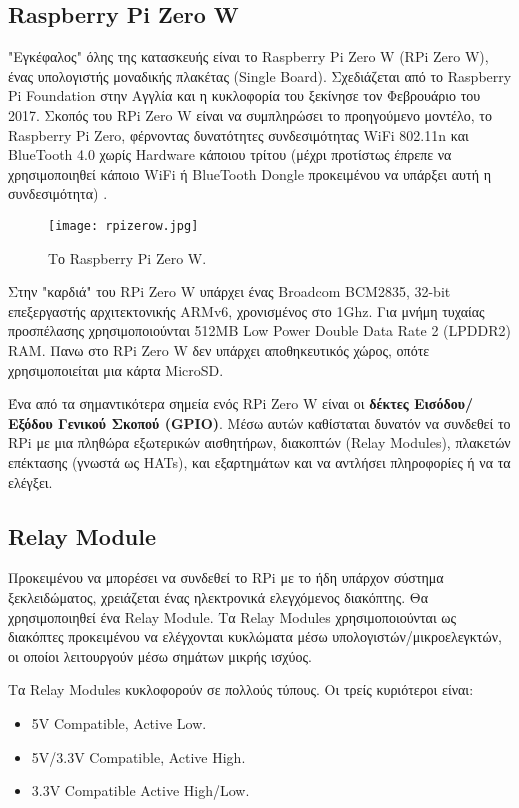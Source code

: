 	\subsection{Raspberry Pi Zero W}
		"Εγκέφαλος" όλης της κατασκευής είναι το Raspberry Pi Zero W (RPi Zero W), ένας υπολογιστής μοναδικής πλακέτας (Single Board). Σχεδιάζεται από το Raspberry Pi Foundation στην Αγγλία και η κυκλοφορία του ξεκίνησε τον Φεβρουάριο του 2017. Σκοπός του RPi Zero W είναι να συμπληρώσει το προηγούμενο μοντέλο, το Raspberry Pi Zero, φέρνοντας δυνατότητες συνδεσιμότητας WiFi 802.11n και BlueTooth 4.0 χωρίς Hardware κάποιου τρίτου (μέχρι προτίστως έπρεπε να χρησιμοποιηθεί κάποιο WiFi ή BlueTooth Dongle προκειμένου να υπάρξει αυτή η συνδεσιμότητα) \textsuperscript{\cite{rpizw}}.

		\begin{figure}[h]
			\centering
				\texttt{[image: rpizerow.jpg]}
			\caption{Το Raspberry Pi Zero W.}
		\end{figure}

		Στην "καρδιά" του RPi Zero W υπάρχει ένας Broadcom BCM2835, 32-bit επεξεργαστής αρχιτεκτονικής ARMv6, χρονισμένος στο 1Ghz. Για μνήμη τυχαίας προσπέλασης χρησιμοποιούνται 512MB Low Power Double Data Rate 2 (LPDDR2) RAM. Πανω στο RPi Zero W δεν υπάρχει αποθηκευτικός χώρος, οπότε χρησιμοποιείται μια κάρτα MicroSD. 

		Ένα από τα σημαντικότερα σημεία ενός RPi Zero W είναι οι \textbf{δέκτες Εισόδου/Εξόδου Γενικού Σκοπού (GPIO)}. Μέσω αυτών καθίσταται δυνατόν να συνδεθεί το RPi με μια πληθώρα εξωτερικών αισθητήρων, διακοπτών (Relay Modules), πλακετών επέκτασης (γνωστά ως HATs), και εξαρτημάτων και να αντλήσει πληροφορίες ή να τα ελέγξει.

	\subsection{Relay Module}
		\label{sub:relay}
		Προκειμένου να μπορέσει να συνδεθεί το RPi με το ήδη υπάρχον σύστημα ξεκλειδώματος, χρειάζεται ένας ηλεκτρονικά ελεγχόμενος διακόπτης. Θα χρησιμοποιηθεί ένα Relay Module. Τα Relay Modules χρησιμοποιούνται ως διακόπτες προκειμένου να ελέγχονται κυκλώματα μέσω υπολογιστών/μικροελεγκτών, οι οποίοι λειτουργούν μέσω σημάτων μικρής ισχύος\textsuperscript{\cite{relay_purpose}}.

		Τα Relay Modules κυκλοφορούν σε πολλούς τύπους. Οι τρείς κυριότεροι είναι:
		\begin{itemize}
			\item 5V Compatible, Active Low. 
			\item 5V/3.3V Compatible, Active High.
			\item 3.3V Compatible Active High/Low.
		\end{itemize}

